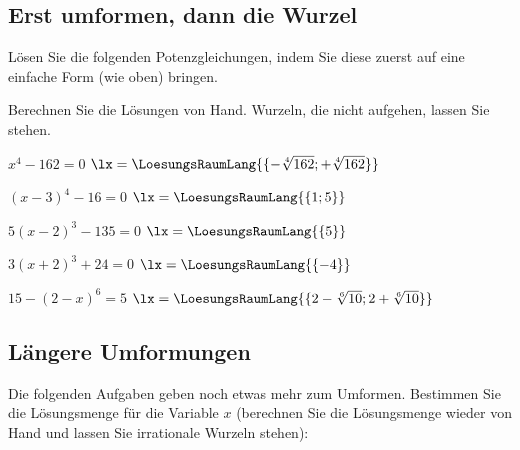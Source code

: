 \subsection{Erst umformen, dann die Wurzel}%
Lösen Sie die folgenden Potenzgleichungen, indem Sie diese zuerst auf eine einfache Form (wie oben) bringen.

Berechnen Sie die Lösungen von Hand. Wurzeln, die nicht aufgehen, lassen Sie stehen.


\begin{bbwAufgabenBlock}

\item
 $x^4-162 = 0$ \hspace{10mm} $\lx=\LoesungsRaumLang{\{-\sqrt[4]{162}; +\sqrt[4]{162}\}}$

\item
 $(x-3)^4 - 16 = 0$ \hspace{10mm} $\lx=\LoesungsRaumLang{\{1; 5\}}$
 \noTRAINER{\newpage}

\item
 $5(x-2)^3 - 135 = 0$ \hspace{10mm} $\lx=\LoesungsRaumLang{\{5\}}$

\item
 $3(x+2)^3 + 24 = 0$ \hspace{10mm} $\lx=\LoesungsRaumLang{\{-4\}}$

\item
 $15-(2-x)^6 = 5$ \hspace{10mm} $\lx=\LoesungsRaumLang{\{2-\sqrt[6]{10}; 2+\sqrt[6]{10}\}}$

\end{bbwAufgabenBlock}

\noTRAINER{\newpage}

\subsection{Längere Umformungen}

Die folgenden Aufgaben geben noch etwas mehr zum Umformen. Bestimmen
Sie die Lösungsmenge für die Variable $x$ (berechnen Sie die
Lösungsmenge wieder von Hand und lassen Sie irrationale Wurzeln stehen):

